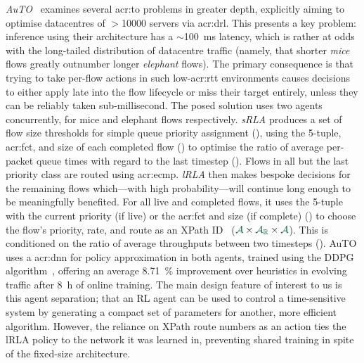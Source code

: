 \emph{AuTO}~\parencite{DBLP:conf/sigcomm/ChenL0L18} examines several \gls{acr:to} problems in greater depth, explicitly aiming to optimise datacentres of $>$\num{10000} servers via \gls{acr:drl}.
This presents a key problem: inference using their architecture has a $\sim$\qty{100}{\milli\second} latency, which is rather at odds with the long-tailed distribution of datacentre traffic (namely, that shorter \emph{mice} flows greatly outnumber longer \emph{elephant} flows).
The primary consequence is that trying to take per-flow actions in such low-\gls{acr:rtt} environments causes decisions to either apply late into the flow lifecycle or miss their target entirely, unless they can be reliably taken sub-millisecond.
The posed solution uses two agents concurrently, for mice and elephant flows respectively.
\emph{sRLA} produces a set of flow size thresholds for simple queue priority assignment (\rllitactreal), using the 5-tuple, \gls{acr:fct}, and size of each completed flow (\rllitstate) to optimise the ratio of average per-packet queue times with regard to the last timestep (\rllitreward).
Flows in all but the last priority class are routed using \gls{acr:ecmp}.
\emph{lRLA} then makes bespoke decisions for the remaining flows which---with high probability---will continue long enough to be meaningfully benefited.
For all live and completed flows, it uses the 5-tuple with the current priority (if live) or the \gls{acr:fct} and size (if complete) (\rllitstate) to choose the flow's priority, rate, and route as an XPath ID~\parencite{DBLP:journals/ton/Hu0W0L0ZG16} ($\rllitact\times\rllitactreal\times\rllitact$).
This is conditioned on the ratio of average throughputs between two timesteps (\rllitreward).
AuTO uses a \gls{acr:dnn} for policy approximation in both agents, trained using the DDPG algorithm~\parencite{DBLP:journals/corr/LillicrapHPHETS15}, offering an average \qty{8.71}{\percent} improvement over heuristics in evolving traffic after \qty{8}{\hour} of online training.
The main design feature of interest to us is this agent separation; that an RL agent can be used to control a time-sensitive system by generating a compact set of parameters for another, more efficient algorithm.
However, the reliance on XPath route numbers as an action ties the lRLA policy to the network it was learned in, preventing shared training in spite of the fixed-size architecture.

